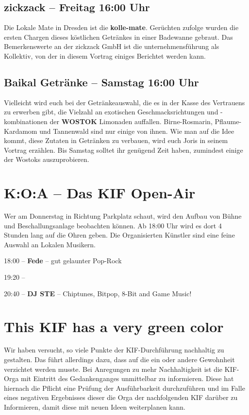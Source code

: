 \subsection*{zickzack -- Freitag 16:00 Uhr}
Die Lokale Mate in Dresden ist die \textbf{kolle-mate}. Gerüchten zufolge wurden die ersten Chargen
dieses köstlichen Getränkes in einer Badewanne gebraut. Das Bemerkenswerte an der zickzack GmbH ist
die unternehmensführung als Kollektiv, von der in diesem Vortrag einiges Berichtet werden kann.

\subsection*{Baikal Getränke -- Samstag 16:00 Uhr}
Vielleicht wird euch bei der Getränkeauswahl, die es in der Kasse des Vertrauens zu erwerben gibt,
die Vielzahl an exotischen Geschmacksrichtungen und -kombinationen der \textbf{WOSTOK} Limonaden
auffallen. Birne-Rosmarin, Pflaume-Kardamom und Tannenwald sind nur einige von ihnen. Wie man auf
die Idee kommt, diese Zutaten in Getränken zu verbauen, wird euch Joris in seinem Vortrag erzählen.
Bis Samstag solltet ihr genügend Zeit haben, zumindest einige der Wostoks auszuprobieren.


\section*{K:O:A -- Das KIF Open-Air}
Wer am Donnerstag in Richtung Parkplatz schaut, wird den Aufbau von Bühne und Beschallungsanlage beobachten können.
Ab 18:00 Uhr wird es dort 4 Stunden lang auf die Ohren geben.
Die Organisierten Künstler sind eine feine Auswahl an Lokalen Musikern.

18:00 -- \textbf{Fede} -- gut gelaunter Pop-Rock

19:20 --

20:40 -- \textbf{DJ STE} -- Chiptunes, Bitpop, 8-Bit and Game Music!

\section*{This KIF has a very green color}
Wir haben versucht, so viele Punkte der KIF-Durchführung nachhaltig zu gestalten. Das führt
allerdings dazu, dass auf die ein oder andere Gewohnheit verzichtet werden musste. Bei Anregungen
zu mehr Nachhaltigkeit ist die KIF-Orga mit Eintritt des Gedankenganges unmittelbar zu informieren.
Diese hat hiernach die Pflicht eine Prüfung der Ausführbarkeit durchzuführen und im Falle eines
negativen Ergebnisses dieser die Orga der nachfolgenden KIF darüber zu Informieren, damit diese mit
neuen Ideen weiterplanen kann.

